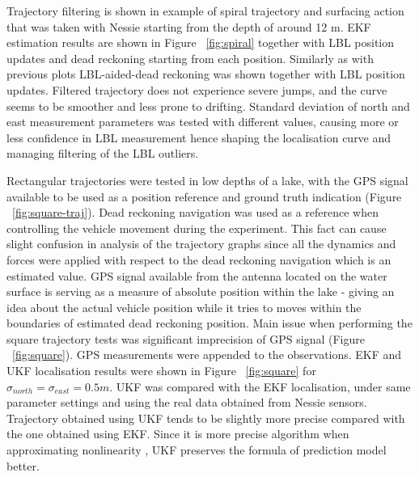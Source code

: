 Trajectory filtering is shown in example of spiral trajectory and surfacing action that was taken with Nessie starting from the depth of around 12 m. EKF estimation results are shown in Figure ~\ref{fig:spiral} together with LBL position updates and dead reckoning starting from each position. Similarly as with previous plots LBL-aided-dead reckoning was shown together with LBL position updates. Filtered trajectory does not experience severe jumps, and the curve seems to be smoother and less prone to drifting. Standard deviation of north and east measurement parameters was tested with different values, causing more or less confidence in LBL measurement hence shaping the localisation curve and managing filtering of the LBL outliers.  

Rectangular trajectories were tested in low depths of a lake, with the GPS signal available to be used as a position reference and ground truth indication (Figure ~\ref{fig:square-traj}). Dead reckoning navigation was used as a reference when controlling the vehicle movement during the experiment. This fact can cause slight confusion in analysis of the trajectory graphs since all the dynamics and forces were applied with respect to the dead reckoning navigation which is an estimated value. GPS signal available from the antenna located on the water surface is serving as a measure of absolute position within the lake - giving an idea about the actual vehicle position while it tries to moves within the boundaries of estimated dead reckoning position. Main issue when performing the square trajectory tests was significant imprecision of GPS signal (Figure ~\ref{fig:square}). GPS measurements were appended to the observations. EKF and UKF localisation results were shown in Figure ~\ref{fig:square} for $\sigma_{north}=\sigma_{east}=0.5m$. UKF was compared with the EKF localisation, under same parameter settings and using the real data obtained from Nessie sensors. Trajectory obtained using UKF tends to be slightly more precise compared with the one obtained using EKF. Since it is more precise algorithm when approximating nonlinearity \cite{julier96} , UKF preserves the formula of prediction model better.
